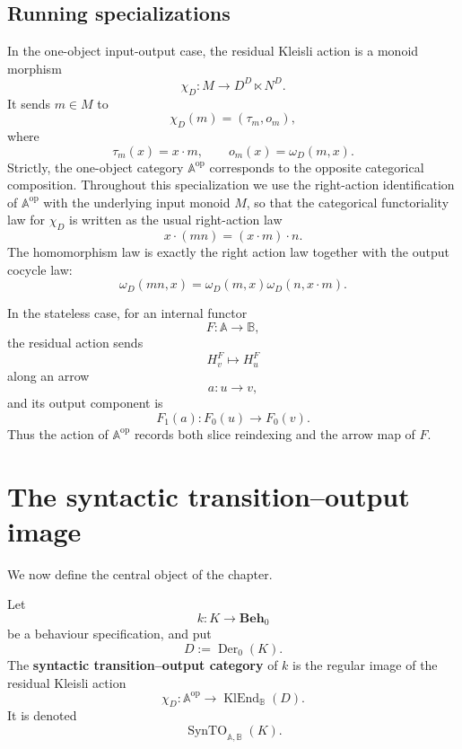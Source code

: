 \subsection{Running specializations}
\label{subsec:syn-to-residual-action-running-specializations}

In the one-object input-output case, the residual Kleisli action is a monoid
morphism
\[
    \chi_D:
    M\to D^D\ltimes N^D.
\]
It sends \(m\in M\) to
\[
    \chi_D(m)=(\tau_m,o_m),
\]
where
\[
    \tau_m(x)=x\cdot m,
    \qquad
    o_m(x)=\omega_D(m,x).
\]
Strictly, the one-object category \(\mathbb A^{\mathrm{op}}\) corresponds to
the opposite categorical composition. Throughout this specialization we use the
right-action identification of \(\mathbb A^{\mathrm{op}}\) with the underlying
input monoid \(M\), so that the categorical functoriality law for \(\chi_D\) is
written as the usual right-action law
\[
    x\cdot(mn)=(x\cdot m)\cdot n.
\]
The homomorphism law is exactly the right action law together with the output
cocycle law:
\[
    \omega_D(mn,x)
    =
    \omega_D(m,x)\omega_D(n,x\cdot m).
\]

In the stateless case, for an internal functor
\[
    F:\mathbb A\to\mathbb B,
\]
the residual action sends
\[
    H_v^F
        \longmapsto
    H_u^F
\]
along an arrow
\[
    a:u\to v,
\]
and its output component is
\[
    F_1(a):F_0(u)\to F_0(v).
\]
Thus the action of \(\mathbb A^{\mathrm{op}}\) records both slice
reindexing and the arrow map of \(F\).

\section{The syntactic transition--output image}
\label{sec:syn-to-syntactic-transition-output-image}

We now define the central object of the chapter.

\begin{definition}
\label{def:syn-to-syntactic-transition-output-category}
    Let
    \[
        k:K\to\mathbf{Beh}_0
    \]
    be a behaviour specification, and put
    \[
        D:=\operatorname{Der}_0(K).
    \]
    The \textbf{syntactic transition--output category} of \(k\) is the regular
    image of the residual Kleisli action
    \[
        \chi_D:
        \mathbb A^{\mathrm{op}}
        \to
        \operatorname{KlEnd}_{\mathbb B}(D).
    \]
    It is denoted
    \[
        \operatorname{SynTO}_{\mathbb A,\mathbb B}(K).
    \]
\end{definition}

